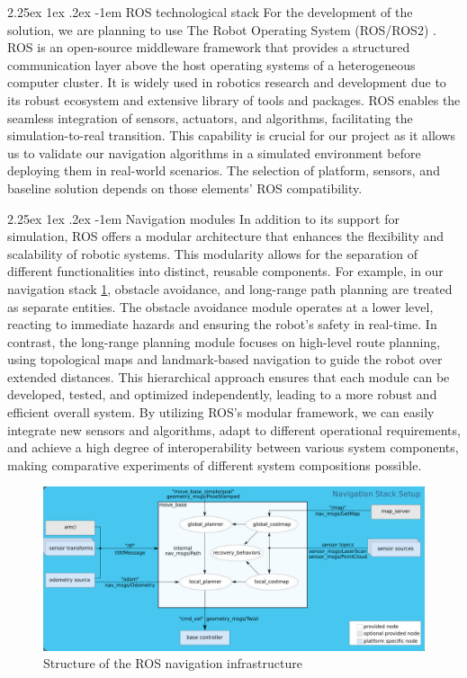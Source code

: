 \documentclass[runningheads]{llncs}
\makeatletter
\renewcommand\paragraph{\@startsection{paragraph}{4}{\z@}%
                                    {2.25ex \@plus1ex \@minus.2ex}%
                                    {-1em}%
                                    {\normalfont\normalsize\bfseries}}
\makeatother
\begin{document}
\paragraph{ROS technological stack} For the development of the solution, we are planning to use The Robot Operating System (ROS/ROS2) \cite{ROS2}.  ROS is an open-source middleware framework that provides a structured communication layer above the host operating systems of a heterogeneous computer cluster. It is widely used in robotics research and development due to its robust ecosystem and extensive library of tools and packages. ROS enables the seamless integration of sensors, actuators, and algorithms, facilitating the simulation-to-real transition. This capability is crucial for our project as it allows us to validate our navigation algorithms in a simulated environment before deploying them in real-world scenarios. The selection of platform, sensors, and baseline solution depends on those elements' ROS compatibility.

\paragraph{Navigation modules} In addition to its support for simulation, ROS offers a modular architecture that enhances the flexibility and scalability of robotic systems. This modularity allows for the separation of different functionalities into distinct, reusable components. For example, in our navigation stack \ref{fig:ROS-navigation}, obstacle avoidance, and long-range path planning are treated as separate entities. The obstacle avoidance module operates at a lower level, reacting to immediate hazards and ensuring the robot's safety in real-time. In contrast, the long-range planning module focuses on high-level route planning, using topological maps and landmark-based navigation to guide the robot over extended distances. This hierarchical approach ensures that each module can be developed, tested, and optimized independently, leading to a more robust and efficient overall system. By utilizing ROS's modular framework, we can easily integrate new sensors and algorithms, adapt to different operational requirements, and achieve a high degree of interoperability between various system components, making comparative experiments of different system compositions possible.

\begin{figure}
    \centering
    \includegraphics[width=0.75\linewidth]{img/ROS_navigation.png}
    \caption{Structure of the ROS navigation infrastructure}
    \label{fig:ROS-navigation}
\end{figure}
\end{document}
